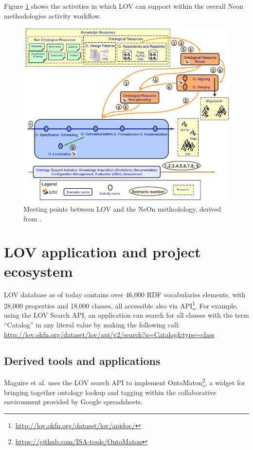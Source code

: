 \documentclass{iosart2c}
\newcommand{\py}[1]{\textcolor{olive}{\textbf{[PIERRE-YVES TO:#1]}}}
\begin{document}
Figure \ref{fig:LOVandNeOn} shows the activities in which LOV can support within the overall Neon methodologies activity workflow.
\begin{figure}[h!tp]
\centering
  \includegraphics[width=.95\linewidth]{neonScenarios.png}
  \caption{Meeting points between LOV and the NeOn methodology, derived from \cite{MC10}.}
  \label{fig:LOVandNeOn}
\end{figure}

\section{LOV application and project ecosystem}
\label{sec:lovecosystem}
LOV database as of today contains over 46,000 RDF vocabularies elements, with 28,000 properties and 18,000 classes, all accessible also via API\footnote{\url{http://lov.okfn.org/dataset/lov/apidoc/}}. For example, using the LOV Search API, an application can search for all classes with the term ``Catalog'' in any literal value by making the following call: \url{http://lov.okfn.org/dataset/lov/api/v2/search?q=Catalog&type=class}
 
\subsection{Derived tools and applications}

Maguire et al. \cite{ontomaton12} uses the LOV search API to implement OntoMaton\footnote{\url{https://github.com/ISA-tools/OntoMaton}}, a widget for bringing together ontology lookup and tagging within the collaborative environment provided by Google spreadsheets. 
\end{document}
